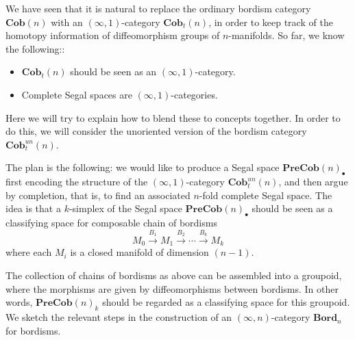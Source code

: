\documentclass[a4paper,11pt]{article}
\theoremstyle{plain}
\theoremstyle{definition}
\theoremstyle{remark}
\begin{document}
We have seen that it is natural to replace the ordinary bordism category $\textbf{Cob}(n)$ with an $(\infty, 1)$-category $\textbf{Cob}_t(n)$, in order to keep track of the homotopy information of diffeomorphism groups of $n$-manifolds. So far, we know the following:: 
\begin{itemize}
    \item $\textbf{Cob}_t(n)$ should be seen as an $(\infty, 1)$-category. 
    \item Complete Segal spaces are $(\infty, 1)$-categories.
\end{itemize}

Here we will try to explain how to blend these to concepts together. In order to do this, we will consider the unoriented version of the bordism category $\textbf{Cob}_t^{un}(n)$. 


The plan is the following: we would like to produce a Segal space $\textbf{PreCob}(n)_{\bullet}$ first encoding the structure of the $(\infty, 1)$-category $\textbf{Cob}_t^{un}(n)$, and then argue by completion, that is, to find an associated $n$-fold complete Segal space. The idea is that a $k$-simplex of the Segal space $\textbf{PreCob}(n)_{\bullet}$ should be seen as a classifying space for composable chain of bordisms 
$$M_0 \xrightarrow{B_1} M_1 \xrightarrow{B_2} \cdots \xrightarrow{B_k} M_k$$
where each $M_i$ is a closed manifold of dimension $(n-1)$.

The collection of chains of bordisms as above can be assembled into a groupoid, where the morphisms are given by diffeomorphisms between bordisms. In other words, $\textbf{PreCob}(n)_k$ should be regarded as a classifying space for this groupoid. We sketch the relevant steps in the construction of an $(\infty, n)$-category $\textbf{Bord}_n$ for bordisms. 
\end{document}
